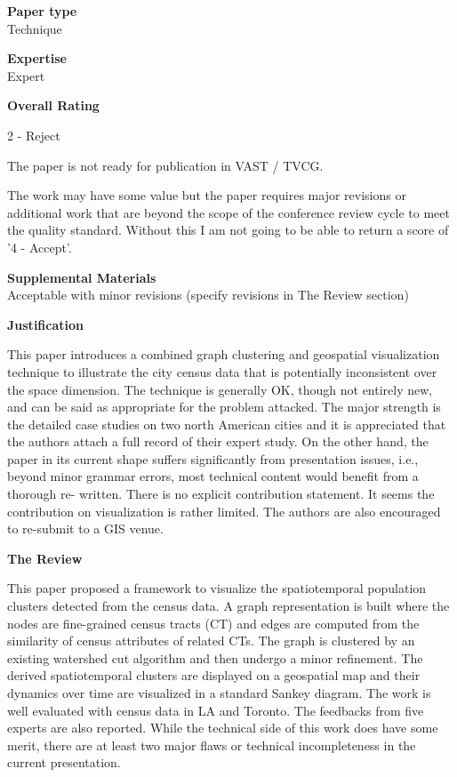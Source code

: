 \documentclass{article}
\begin{document}
\begin{itemize}

\item{\textbf{Paper type}\\Technique}

\item{\textbf{Expertise}\\Expert}

\item{\textbf{Overall Rating}

    2 - Reject
    
    The paper is not ready for publication in VAST / TVCG.
    
    The work may have some value but the paper requires major revisions or
    additional work that are beyond the scope of the conference review cycle to meet
    the quality standard. Without this I am not going to be able to return a score of
    '4 - Accept'.}

\item{\textbf{Supplemental Materials}\\Acceptable with minor revisions (specify revisions in The Review section)}

\item{\textbf{Justification}

    This paper introduces a combined graph clustering and geospatial visualization
    technique to illustrate the city census data that is potentially inconsistent over
    the space dimension. The technique is generally OK, though not entirely new, and
    can be said as appropriate for the problem attacked. The major strength is the
    detailed case studies on two north American cities and it is appreciated that the
    authors attach a full record of their expert study. On the other hand, the paper
    in its current shape suffers significantly from presentation issues, i.e., beyond
    minor grammar errors, most technical content would benefit from a thorough re-
    written. There is no explicit contribution statement. It seems the contribution on
    visualization is rather limited. The authors are also encouraged to re-submit to a
    GIS venue.

\item{\textbf{The Review}

    This paper proposed a framework to visualize the spatiotemporal population
    clusters detected from the census data. A graph representation is built where the
    nodes are fine-grained census tracts (CT) and edges are computed from the
    similarity of census attributes of related CTs. The graph is clustered by an
    existing watershed cut algorithm and then undergo a minor refinement. The derived
    spatiotemporal clusters are displayed on a geospatial map and their dynamics over
    time are visualized in a standard Sankey diagram. The work is well evaluated with
    census data in LA and Toronto. The feedbacks from five experts are also reported.
    While the technical side of this work does have some merit, there are at least two
    major flaws or technical incompleteness in the current presentation.

}}
\end{itemize}
\end{document}
